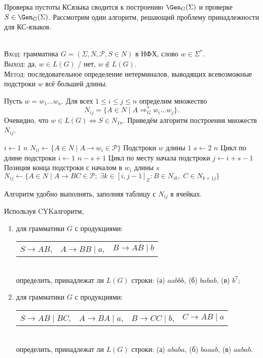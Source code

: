 Проверка пустоты КС\nbdash{}языка сводится к построению $\Gen_G(\Sigma)$ и
проверке $S \in \Gen_G(\Sigma)$. Рассмотрим один алгоритм, решающий проблему
принадлежности для КС-языков.

\begin{Algo}
\nspace\\
\textsc{Вход}: грамматика $G=(\Sigma, N, \mathcal P, S \in N)$ в НФХ,
слово $w \in \Sigma^*$.\\
\textsc{Выход}: да, $w \in L(G)$ / нет, $w \not \in L(G)$.\\
\textsc{Метод}: последовательное определение нетерминалов, выводящих
всевозможные подстроки $w$ всё большей длины.

Пусть $w = w_1 \ldots w_n$. Для всех $1 \leqslant i \leqslant j \leqslant n$
определим множество 
$$
    N_{ij} = \{ A \in N \mid A \Rightarrow^*_G w_i \ldots w_j \}.
$$
Очевидно, что $w \in L(G) \Leftrightarrow S \in N_{1n}$. Приведём алгоритм
построения множеств $N_{ij}$.
\begin{codebox}
\zi\For $i \gets 1$ \To $n$
\zi     \Do
        $N_{ii} \gets \{ A \in N \mid A \to w_i \in \mathcal P  \}$ 
        \Comment Подстроки $w$ длины $1$
        \End
\zi\For $s \gets 2$ \To $n$ \Comment Цикл по длине подстроки
\zi     \Do
        \For $i \gets 1$ \To $n - s + 1$ \Comment Цикл по месту начала подстроки
\zi         $j \gets i + s - 1$ 
            \Comment Позиция конца подстроки с началом в $w_i$ длины $s$
\zi         $N_{ij} \gets \{ A \in N \mid A \to BC \in \mathcal P; \;
                \exists k \in [i, j-1]_{\mathbb Z} \colon B \in N_{ik}, \; 
                C \in N_{k+1 j} \} $
        \End
\end{codebox}
\end{Algo}
\begin{Remark}
Алгоритм удобно выполнять, заполняя таблицу с $N_{ij}$ в ячейках.
\end{Remark}
Используя CYK\nbdash{}алгоритм,
\begin{enumerate}
    \item 
    для грамматики $G$ с продукциями:\\
    \begin{tabular}{ccc} 
        $S \to AB$, &
        $A \to BB \mid a$,&
        $B \to AB \mid b$
    \end{tabular}\\
    определить, принадлежат ли $L(G)$ строки: (а) $aabbb$, (б) $babab$,
    (в) $b^7$;
    
    \item
    для грамматики $G$ с продукциями:\\
    \begin{tabular}{cccc} 
        $S \to AB \mid BC$,&
        $A \to BA \mid a$,&
        $B \to CC \mid b$,&
        $C \to AB \mid a$
    \end{tabular}\\
    определить, принадлежат ли $L(G)$ строки: (а) $ababa$, (б) $baaab$, (в) $aabab$.
\end{enumerate}

